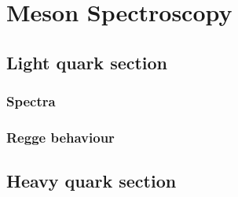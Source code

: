 \chapter{Meson Spectroscopy}
\label{chap:spectra}

\section{Light quark section}
	\subsection{Spectra}
	\subsection{Regge behaviour}
\section{Heavy quark section}

	
	